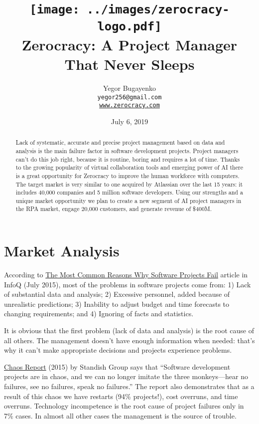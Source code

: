 \documentclass{main}
\title{\texttt{[image: ../images/zerocracy-logo.pdf]}\\
  Zerocracy: A Project Manager That Never Sleeps\\
  {\small\colorbox{blue!20!black}{\color{white}{Executive Summary}}}}
\author{Yegor Bugayenko\\
  \texttt{yegor256@gmail.com}\\
  \href{https://www.zerocracy.com}{\texttt{www.zerocracy.com}}\\[1em]
  \href{https://github.com/zold-io/papers/releases/tag/\zoldversion}{\texttt{\zoldversion}}}
\begin{document}
\date{July 6, 2019}
\maketitle

\begin{abstract}
Lack of systematic, accurate and precise project management based on data and
analysis is the main failure factor in software development projects. Project
managers can't do this job right, because it is routine, boring and requires a
lot of time. Thanks to the growing popularity of virtual collaboration tools and
emerging power of AI there is a great opportunity for Zerocracy to improve the
human workforce with computers. The target market is very similar to one
acquired by Atlassian over the last 15 years: it includes 40,000 companies and 5
million software developers. Using our strengths and a unique market opportunity
we plan to create a new segment of AI project managers in the RPA market, engage
20,000 customers, and generate revenue of \$400M.
\end{abstract}

\section{Market Analysis}

According to
\href{https://www.infoq.com/articles/software-failure-reasons}{The Most Common Reasons Why Software Projects Fail}
article in InfoQ
(July 2015), most of the problems in software projects come from: 1) Lack of
substantial data and analysis; 2) Excessive personnel, added because of
unrealistic predictions; 3) Inability to adjust budget and time forecasts to
changing requirements; and 4) Ignoring of facts and statistics.

It is obvious that the first problem (lack of data and analysis) is the root
cause of all others. The management doesn't have enough information when needed:
that's why it can't make appropriate decisions and projects experience problems.

\href{https://www.projectsmart.co.uk/white-papers/chaos-report.pdf}{Chaos Report} (2015)
by Standish Group says that ``Software development projects
are in chaos, and we can no longer imitate the three monkeys---hear no failures,
see no failures, speak no failures.'' The report also demonstrates that as a
result of this chaos we have restarts (94\% projects!), cost overruns, and time
overruns. Technology incompetence is the root cause of project failures only in
7\% cases. In almost all other cases the management is the source of trouble.
\end{document}
